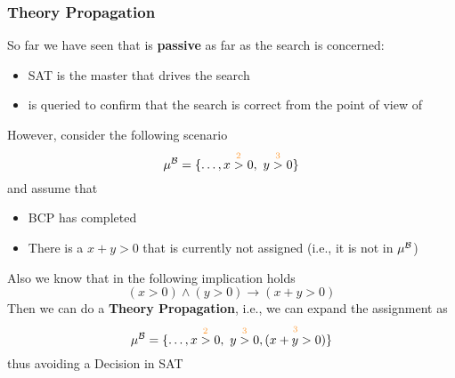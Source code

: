 \begin{frame}
  \frametitle{Theory Propagation}

  \scriptsize

  So far we have seen that \tsolver is {\bf passive} as far as the search is concerned:
  \begin{itemize}
    \item SAT is the master that drives the search
    \item \tsolver is queried to confirm that the search is correct from the point of view of \T
  \end{itemize}
  However, consider the following scenario
  $$\babst{\mu} = \{ \ldots, \dec{x > 0}{2},\ \dec{y > 0}{3} \}$$
  and assume that 
  \begin{itemize}
    \item BCP has completed 
    \item There is a \tatom $x + y > 0$ that is currently not assigned (i.e., it is not in $\mu^{\mathcal{B}}$)
  \end{itemize}
  Also we know that in \T the following implication holds
  $$
    ( x > 0 ) \wedge ( y > 0 ) \rightarrow ( x + y > 0 )
  $$
  Then we can do a {\bf Theory Propagation}, i.e., we can expand the assignment as
  $$
    \babst{\mu} = \{ \ldots, \dec{x > 0}{2},\ \dec{y > 0}{3}, \dec{(x+y > 0)}{3} \}
  $$
  thus avoiding a Decision in SAT

\end{frame}

